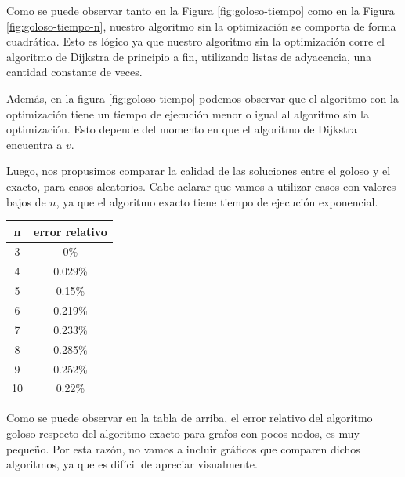 Como se puede observar tanto en la Figura \ref{fig:goloso-tiempo} como en la Figura \ref{fig:goloso-tiempo-n}, nuestro algoritmo sin la optimización se comporta de forma cuadrática. Esto es lógico ya que nuestro algoritmo sin la optimización corre el algoritmo de Dijkstra de principio a fin, utilizando listas de adyacencia, una cantidad constante de veces.

Además, en la figura \ref{fig:goloso-tiempo} podemos observar que el algoritmo con la optimización tiene un tiempo de ejecución menor o igual al algoritmo sin la optimización. Esto depende del momento en que el algoritmo de Dijkstra encuentra a $v$.

Luego, nos propusimos comparar la calidad de las soluciones entre el goloso y el exacto, para casos aleatorios. Cabe aclarar que vamos a utilizar casos con valores bajos de $n$, ya que el algoritmo exacto tiene tiempo de ejecución exponencial.

\begin{center}
 \begin{tabular}{|c|c|}
      \hline
      n&error relativo \\
      \hline
      3&0\%\\
      4&0.029\%\\
      5&0.15\%\\
      6&0.219\%\\
      7&0.233\%\\
      8&0.285\%\\
      9&0.252\%\\
      10&0.22\%\\
      \hline
    \end{tabular}
\end{center}

Como se puede observar en la tabla de arriba, el error relativo del algoritmo goloso respecto del algoritmo exacto para grafos con pocos nodos, es muy pequeño. Por esta razón, no vamos a incluir gráficos que comparen dichos algoritmos, ya que es difícil de apreciar visualmente.


